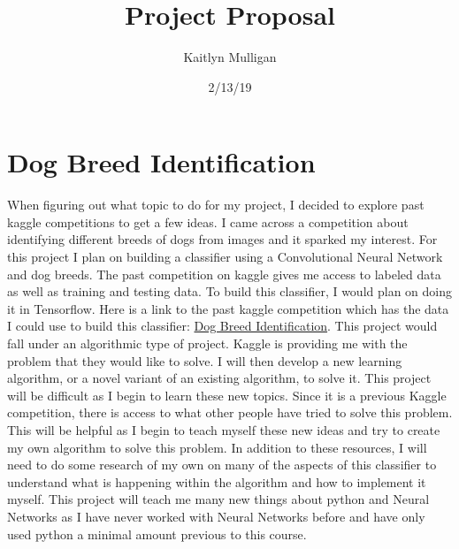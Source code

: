 \documentclass[a4paper]{article}
\title{Project Proposal}
\author{Kaitlyn Mulligan}
\date{2/13/19}
\begin{document}
\lstset{language=Python}

\maketitle

\section{Dog Breed Identification}
When figuring out what topic to do for my project, I decided to explore past kaggle 
competitions to get a few ideas.  I came across a competition about identifying 
different breeds of dogs from images and it sparked my interest.  For this project 
I plan on building a classifier using a Convolutional Neural Network and dog 
breeds.  The past competition on kaggle gives me access to labeled data as well 
as training and testing data.  To build this classifier, I would plan on doing it 
in Tensorflow.  Here is a link to the past kaggle competition which has the data I 
could use to build this classifier: \href{https://www.kaggle.com/c/dog-breed-identification}
{Dog Breed Identification}.  This project would fall under an algorithmic type of project.  
Kaggle is providing me with the problem that they would like to solve.  I will then develop 
a new learning algorithm, or a novel variant of an existing algorithm, to solve it.  This 
project will be difficult as I begin to learn these new topics.  Since it is a previous 
Kaggle competition, there is access to what other people have tried to solve this problem.  
This will be helpful as I begin to teach myself these new ideas and try to create my own 
algorithm to solve this problem.  In addition to these resources, I will need to do some 
research of my own on many of the aspects of this classifier to understand what is happening 
within the algorithm and how to implement it myself.  This project will teach me many new 
things about python and Neural Networks as I have never worked with Neural Networks before 
and have only used python a minimal amount previous to this course.
\end{document}
